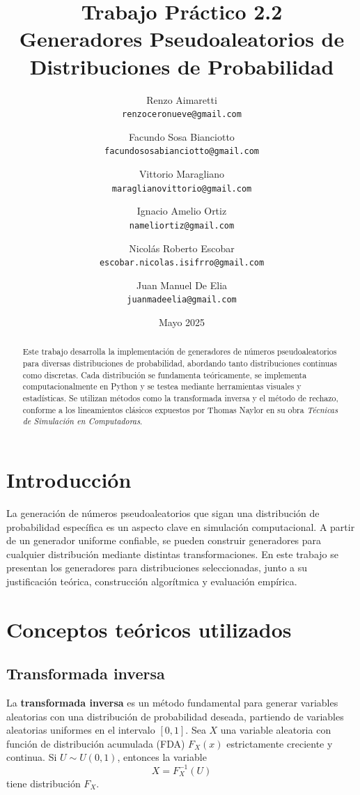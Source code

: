 \documentclass{article}
\title{Trabajo Práctico 2.2 \\
Generadores Pseudoaleatorios de Distribuciones de Probabilidad}
\author{
    Renzo Aimaretti \\ \texttt{renzoceronueve@gmail.com}
    \and
    Facundo Sosa Bianciotto \\ \texttt{facundososabianciotto@gmail.com}
    \and
    Vittorio Maragliano \\ \texttt{maraglianovittorio@gmail.com}
    \and
    Ignacio Amelio Ortiz \\ \texttt{nameliortiz@gmail.com}
    \and
    Nicolás Roberto Escobar \\ \texttt{escobar.nicolas.isifrro@gmail.com}
    \and
    Juan Manuel De Elia \\ \texttt{juanmadeelia@gmail.com}
}
\date{Mayo 2025}
\begin{document}
\maketitle

\begin{abstract}
Este trabajo desarrolla la implementación de generadores de números pseudoaleatorios para diversas distribuciones de probabilidad, abordando tanto distribuciones continuas como discretas. Cada distribución se fundamenta teóricamente, se implementa computacionalmente en Python y se testea mediante herramientas visuales y estadísticas. Se utilizan métodos como la transformada inversa y el método de rechazo, conforme a los lineamientos clásicos expuestos por Thomas Naylor en su obra \textit{Técnicas de Simulación en Computadoras}.
\end{abstract}

\section{Introducción}
La generación de números pseudoaleatorios que sigan una distribución de probabilidad específica es un aspecto clave en simulación computacional. A partir de un generador uniforme confiable, se pueden construir generadores para cualquier distribución mediante distintas transformaciones. En este trabajo se presentan los generadores para distribuciones seleccionadas, junto a su justificación teórica, construcción algorítmica y evaluación empírica.

\section{Conceptos teóricos utilizados}

\subsection{Transformada inversa}

La \textbf{transformada inversa} es un método fundamental para generar variables aleatorias con una distribución de probabilidad deseada, partiendo de variables aleatorias uniformes en el intervalo $[0,1]$. Sea $X$ una variable aleatoria con función de distribución acumulada (FDA) $F_X(x)$ estrictamente creciente y continua. Si $U \sim U(0,1)$, entonces la variable
\begin{equation}
    X = F_X^{-1}(U)
\end{equation}
tiene distribución $F_X$.
\end{document}
